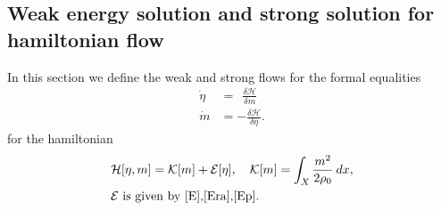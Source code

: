 \documentclass[10pt, letterpaper]{article}
\def\E{{\mathcal{E}}}
\def\H{{\mathcal{H}}}
\def\K{{\mathcal{K}}}
\theoremstyle{definition}
\theoremstyle{remark}
\begin{document}
% 
% 
% 

\subsection{Weak energy solution and strong solution for hamiltonian flow}
In this section we define the weak and strong flows for the formal equalities
\begin{align*}
 \dot{\eta} &= ~~\frac{\delta \H}{\delta m}\\%
 \dot{m} &= -\frac{\delta \H}{\delta \eta}.%
\end{align*}
for the hamiltonian
\begin{equation}\label{H}
\begin{aligned} 
 &\H[\eta,m] = \K[m] + \E[\eta], \quad \K[m] = \int_X \frac{m^2}{2\rho_0} \: dx, \\
 &\text{$\E$ is given by \eqref{E},\eqref{Era},\eqref{Ep}.}
\end{aligned}
\end{equation}
\end{document}
